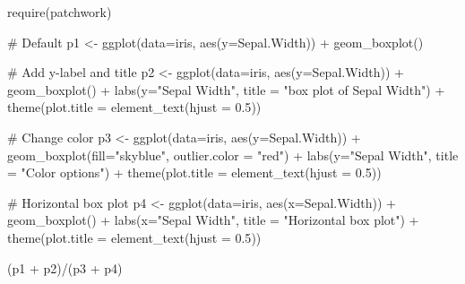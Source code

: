 \documentclass[
  letterpaper,
  DIV=11,
  numbers=noendperiod]{scrreprt}
\newenvironment{Shaded}{\begin{snugshade}}{\end{snugshade}}
\newcommand{\AttributeTok}[1]{\textcolor[rgb]{0.40,0.45,0.13}{#1}}
\newcommand{\CommentTok}[1]{\textcolor[rgb]{0.37,0.37,0.37}{#1}}
\newcommand{\FloatTok}[1]{\textcolor[rgb]{0.68,0.00,0.00}{#1}}
\newcommand{\FunctionTok}[1]{\textcolor[rgb]{0.28,0.35,0.67}{#1}}
\newcommand{\NormalTok}[1]{\textcolor[rgb]{0.00,0.23,0.31}{#1}}
\newcommand{\OtherTok}[1]{\textcolor[rgb]{0.00,0.23,0.31}{#1}}
\newcommand{\SpecialCharTok}[1]{\textcolor[rgb]{0.37,0.37,0.37}{#1}}
\newcommand{\StringTok}[1]{\textcolor[rgb]{0.13,0.47,0.30}{#1}}
\begin{document}
\begin{Shaded}
\begin{Highlighting}[]
\FunctionTok{require}\NormalTok{(patchwork)}

\CommentTok{\# Default}
\NormalTok{p1 }\OtherTok{\textless{}{-}} \FunctionTok{ggplot}\NormalTok{(}\AttributeTok{data=}\NormalTok{iris, }\FunctionTok{aes}\NormalTok{(}\AttributeTok{y=}\NormalTok{Sepal.Width)) }\SpecialCharTok{+}
        \FunctionTok{geom\_boxplot}\NormalTok{()}

\CommentTok{\# Add y{-}label and title}
\NormalTok{p2 }\OtherTok{\textless{}{-}} \FunctionTok{ggplot}\NormalTok{(}\AttributeTok{data=}\NormalTok{iris, }\FunctionTok{aes}\NormalTok{(}\AttributeTok{y=}\NormalTok{Sepal.Width)) }\SpecialCharTok{+}
        \FunctionTok{geom\_boxplot}\NormalTok{() }\SpecialCharTok{+}
        \FunctionTok{labs}\NormalTok{(}\AttributeTok{y=}\StringTok{"Sepal Width"}\NormalTok{, }\AttributeTok{title =} \StringTok{"box plot of Sepal Width"}\NormalTok{) }\SpecialCharTok{+}
        \FunctionTok{theme}\NormalTok{(}\AttributeTok{plot.title =} \FunctionTok{element\_text}\NormalTok{(}\AttributeTok{hjust =} \FloatTok{0.5}\NormalTok{))}

\CommentTok{\# Change color}
\NormalTok{p3 }\OtherTok{\textless{}{-}} \FunctionTok{ggplot}\NormalTok{(}\AttributeTok{data=}\NormalTok{iris, }\FunctionTok{aes}\NormalTok{(}\AttributeTok{y=}\NormalTok{Sepal.Width)) }\SpecialCharTok{+}
        \FunctionTok{geom\_boxplot}\NormalTok{(}\AttributeTok{fill=}\StringTok{"skyblue"}\NormalTok{, }\AttributeTok{outlier.color =} \StringTok{"red"}\NormalTok{) }\SpecialCharTok{+}
        \FunctionTok{labs}\NormalTok{(}\AttributeTok{y=}\StringTok{"Sepal Width"}\NormalTok{, }\AttributeTok{title =} \StringTok{"Color options"}\NormalTok{) }\SpecialCharTok{+}
        \FunctionTok{theme}\NormalTok{(}\AttributeTok{plot.title =} \FunctionTok{element\_text}\NormalTok{(}\AttributeTok{hjust =} \FloatTok{0.5}\NormalTok{))}

\CommentTok{\# Horizontal box plot}
\NormalTok{p4 }\OtherTok{\textless{}{-}} \FunctionTok{ggplot}\NormalTok{(}\AttributeTok{data=}\NormalTok{iris, }\FunctionTok{aes}\NormalTok{(}\AttributeTok{x=}\NormalTok{Sepal.Width)) }\SpecialCharTok{+}
        \FunctionTok{geom\_boxplot}\NormalTok{() }\SpecialCharTok{+}
        \FunctionTok{labs}\NormalTok{(}\AttributeTok{x=}\StringTok{"Sepal Width"}\NormalTok{, }\AttributeTok{title =} \StringTok{"Horizontal box plot"}\NormalTok{) }\SpecialCharTok{+}
        \FunctionTok{theme}\NormalTok{(}\AttributeTok{plot.title =} \FunctionTok{element\_text}\NormalTok{(}\AttributeTok{hjust =} \FloatTok{0.5}\NormalTok{))}

\NormalTok{(p1 }\SpecialCharTok{+}\NormalTok{ p2)}\SpecialCharTok{/}\NormalTok{(p3 }\SpecialCharTok{+}\NormalTok{ p4)}
\end{Highlighting}
\end{Shaded}
\end{document}
